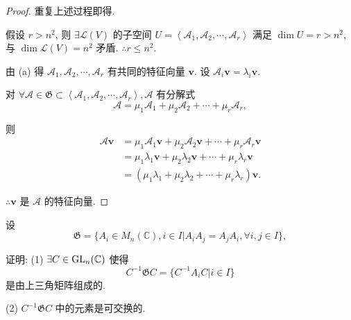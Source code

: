 \documentclass{ctexart}
\begin{document}
\begin{proof}
    重复上述过程即得.
    
    假设 $r>n^2$, 则 $\exists\mathcal{L}(V)$ 的子空间 $U=\left<\mathcal{A}_1,\mathcal{A}_2,\cdots,\mathcal{A}_r\right>$ 满足 $\dim U=r>n^2$, 与 $\dim\mathcal{L}(V)=n^2$ 矛盾. $\therefore r\leq n^2$.

    由 (a) 得 $\mathcal{A}_1,\mathcal{A}_2,\cdots,\mathcal{A}_r$ 有共同的特征向量 $\boldsymbol{v}$. 设 $\mathcal{A}_i\boldsymbol{v}=\lambda_i\boldsymbol{v}$.

    对 $\forall\mathcal{A}\in\mathfrak{G}\subset\left<\mathcal{A}_1,\mathcal{A}_2,\cdots,\mathcal{A}_r\right>,\mathcal{A}$ 有分解式
    \[\mathcal{A}=\mu_1\mathcal{A}_1+\mu_2\mathcal{A}_2+\cdots+\mu_r\mathcal{A}_r,\]

    则
    \begin{align*}
        \mathcal{A}\boldsymbol{v} & =\mu_1\mathcal{A}_1\boldsymbol{v}+\mu_2\mathcal{A}_2\boldsymbol{v}+\cdots+\mu_r\mathcal{A}_r\boldsymbol{v} \\
        & =\mu_1\lambda_1\boldsymbol{v}+\mu_2\lambda_2\boldsymbol{v}+\cdots+\mu_r\lambda_r\boldsymbol{v} \\
        & =(\mu_1\lambda_1+\mu_2\lambda_2+\cdots+\mu_r\lambda_r)\boldsymbol{v}.
    \end{align*}

    $\therefore\boldsymbol{v}$ 是 $\mathcal{A}$ 的特征向量.
\end{proof}
\begin{exercise}%
    设
    \[\mathfrak{G}=\{A_i\in M_n(\mathbb{C}),i\in I|A_iA_j=A_jA_i,\forall i,j\in I\},\]

    证明: (1) $\exists C\in\operatorname{GL} _n(\mathbb{C})$ 使得
    \[C^{-1}\mathfrak{G}C=\{C^{-1}A_iC|i\in I\}\]
    是由上三角矩阵组成的.

    (2) $C^{-1}\mathfrak{G}C$ 中的元素是可交换的.
\end{exercise}
\end{document}
